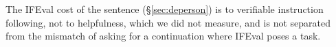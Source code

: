 The IFEval cost of the sentence (\S\ref{sec:deperson}) is to verifiable instruction following, not to helpfulness, which we did not measure, and is not separated from the mismatch of asking for a continuation where IFEval poses a task.
